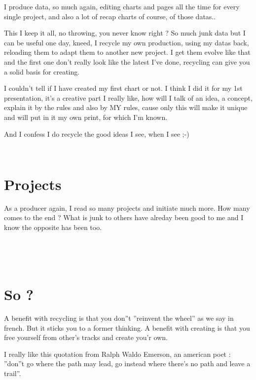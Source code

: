 I produce data, so much again, editing charts and pages all the time for
every single project, and also a lot of recap charts of course, of
those datas..

This I keep it all, no throwing, you never know right ? So much junk
data but I can be useful one day, kneed, I recycle my own production,
using my datas back, reloading them to adapt them to another new
project. I get them evolve like that and the first one
don{\textquoteright}t really look like the latest I{\textquoteright}ve
done, recycling can give you a solid basis for creating.~

I couldn{\textquoteright}t tell if I have created my first chart or not.
I think I did it for my 1st presentation, it{\textquoteright}s a
creative part I really like, how will I talk of an idea, a concept,
explain it by the rules and also by MY rules, cause only this will make
it unique and will put in it my own print, for which
I{\textquoteright}m known.

And I confess I do recycle the good ideas I see, when I see ;-)

~

\section[Projects]{\rmfamily Projects}
As a producer again, I read so many projects and initiate much more. How
many comes to the end ? What is junk to others have alreday been good
to me and I know the opposite has been too.


~

~

\section[So ?]{\rmfamily So ?}
A benefit with recycling is that you don{\textquotedblright}t
{\textquotedblright}reinvent the wheel{\textquotedblright} as we say in
french. But it sticks you to a former thinking. A benefit with creating
is that you free yourself from other{\textquoteright}s tracks and
create you{\textquoteright}r own.

I really like this quotation from Ralph Waldo Emerson, an american poet
: {\textquotedblright}don{\textquotedblright}t go where the path may
lead, go instead where there{\textquoteright}s no path and leave a
trail{\textquotedblright}.

~

